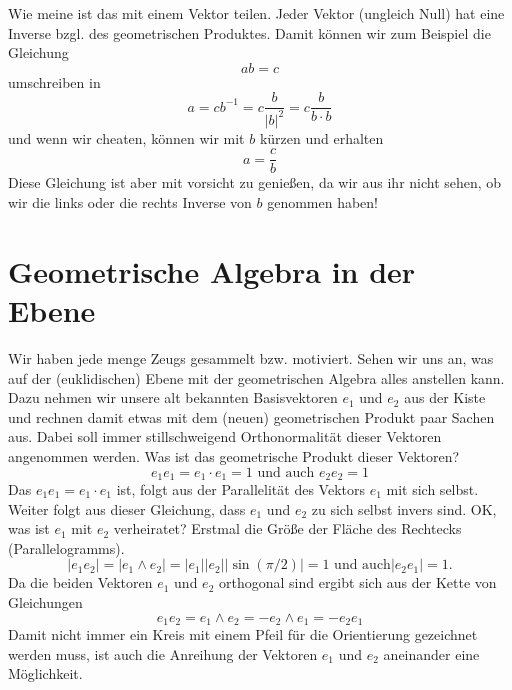 \documentclass[fleqn]{scrartcl}
\numberwithin{equation}{section}
\begin{document}
Wie meine ist das mit einem Vektor teilen. Jeder Vektor (ungleich Null) hat
eine Inverse bzgl. des geometrischen Produktes. Damit können wir zum Beispiel
die Gleichung
\[ab=c\]
umschreiben in
\[a=cb^{-1}=c\frac{b}{|b|^2}=c\frac{b}{b\cdot b}\]
und wenn wir cheaten, können wir mit $b$ kürzen und erhalten
\[a=\frac{c}{b}\]
Diese Gleichung ist aber mit vorsicht zu genießen, da wir aus ihr nicht sehen,
ob wir die links oder die rechts Inverse von $b$ genommen haben!
\section{Geometrische Algebra in der Ebene}
Wir haben jede menge Zeugs gesammelt bzw. motiviert. Sehen wir uns an, was auf
der (euklidischen) Ebene mit der geometrischen Algebra alles anstellen kann.
Dazu nehmen wir unsere alt bekannten Basisvektoren $e_1$ und $e_2$ aus der
Kiste und rechnen damit etwas mit dem (neuen) geometrischen Produkt paar
Sachen aus. Dabei soll immer stillschweigend Orthonormalität dieser Vektoren
angenommen werden. Was ist das geometrische Produkt dieser Vektoren?
\[e_1e_1=e_1\cdot e_1=1\textrm{ und auch }e_2e_2=1\]
Das $e_1e_1 = e_1\cdot e_1$ ist, folgt aus der Parallelität des Vektors $e_1$
mit sich selbst. Weiter folgt aus dieser Gleichung, dass $e_1$ und $e_2$ zu
sich selbst invers sind. OK, was ist $e_1$ mit $e_2$ verheiratet? Erstmal die
Größe der Fläche des Rechtecks (Parallelogramms).
\[|e_1e_2|=|e_1\wedge e_2|=|e_1||e_2||\sin(\pi/2)|=1\textrm{ und auch
}|e_2e_1|=1.\]
Da die beiden Vektoren $e_1$ und $e_2$ orthogonal sind ergibt sich aus der
Kette von Gleichungen
\[e_1e_2=e_1\wedge e_2 = -e_2\wedge e_1 = -e_2e_1\]
Damit nicht immer ein Kreis mit einem Pfeil für die Orientierung gezeichnet
werden muss, ist auch die Anreihung der Vektoren $e_1$ und $e_2$ aneinander
eine Möglichkeit.
\end{document}
